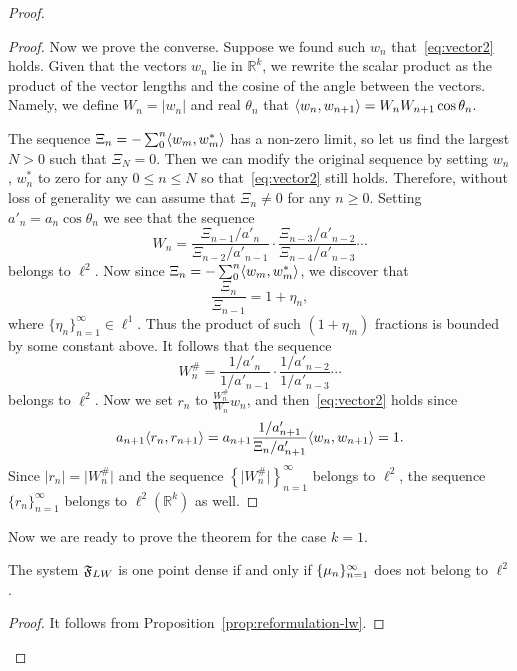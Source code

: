 \begin{proof}
\begin{proof}
      Now we prove the converse.
      Suppose we found such $w_n$ that~\eqref{eq:vector2} holds.
      Given that the vectors $w_n$ lie in $\mathbb{R}^k$, we rewrite the scalar product as
        the product of the vector lengths and the cosine of the angle between the vectors.
      Namely, we define $W_n = \lvert w_n\rvert$ and real $\theta_n$ that
        $\langle w_{n}, w_{n+1} \rangle = W_n W_{n+1} \cos{\theta_n}.$

      The sequence $\Xi_n = -\sum_0^n \langle w_m, w^*_m \rangle$ has a non-zero limit, so let us
        find the largest $N > 0$ such that $\Xi_N = 0$.
      Then we can modify the original sequence by setting $w_n$, $w^*_n$ to zero for any $0 \leq n \leq N$ so that~\eqref{eq:vector2}
        still holds.
      Therefore, without loss of generality we can assume that $\Xi_n \neq 0$ for any $n \geq 0$.
      Setting $a'_n = a_n \cos{\theta_n}$ we see that the sequence
      \[
        W_n = \frac{\Xi_{n-1}/a'_n}{\Xi_{n-2}/a'_{n-1}} \cdot \frac{\Xi_{n-3}/a'_{n-2}}{\Xi_{n-4}/a'_{n-3}} \cdots
      \]
        belongs to $\ell^2$.
      Now since $\Xi_n = -\sum_0^n \langle w_m, w^*_m \rangle$, we discover that
      \[
        \frac{\Xi_n}{\Xi_{n-1}} = 1 + \eta_n,
      \]
        where $\{\eta_n\}_{n=1}^\infty \in \ell^1$.
      Thus the product of such $(1 + \eta_m)$ fractions is bounded by some constant above.
      It follows that the sequence
      \[
        W^\#_n = \frac{1/a'_n}{1/a'_{n-1}} \cdot \frac{1/a'_{n-2}}{1/a'_{n-3}} \cdots
      \]
        belongs to $\ell^2$.
      Now we set $r_n$ to $\frac{W^\#_n}{W_n}w_n$, and then~\eqref{eq:vector2} holds since
      \[
        a_{n+1} \langle r_n, r_{n+1} \rangle = a_{n+1} \frac{1/a'_{n+1}}{\Xi_n/a'_{n+1}} \langle w_n, w_{n+1} \rangle = 1.
      \]
      Since $\lvert r_n \rvert = \lvert W^\#_n \rvert$ and the sequence $\left\{\lvert W^\#_n \rvert\right\}_{n=1}^\infty$ belongs to $\ell^2$,
        the sequence $\{r_n\}_{n=1}^\infty$ belongs to $\ell^2(\mathbb{R}^k)$ as well.
    \end{proof}

    Now we are ready to prove the theorem for the case $k=1$.
    \begin{prop}
      The system $\mathfrak{F}_{LW}$ is one point dense if and only if $\{{\mu}_n\}_{n=1}^\infty$ does not belong to $\ell^2$.
    \end{prop}
    \begin{proof}
      It follows from Proposition~\ref{prop:reformulation-lw}.


\end{proof}
\end{proof}

